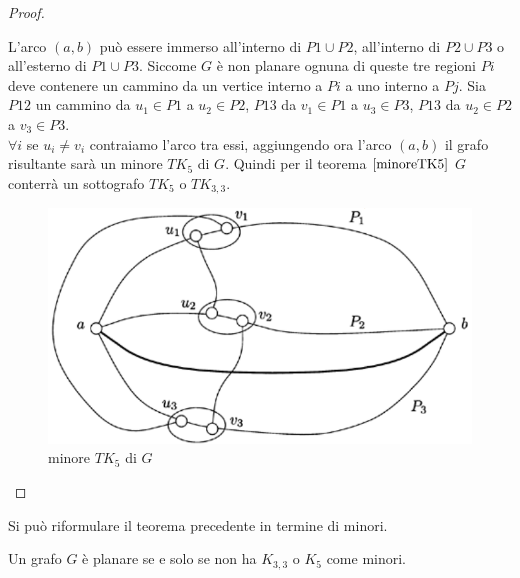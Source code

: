\begin{teorema}
\begin{proof}
\begin{enumerate}
            L'arco \((a,b)\) può essere immerso all'interno di \(P1 \cup P2\), all'interno di \(P2 \cup P3\) o all'esterno di \(P1 \cup P3\). Siccome \(G\) è non planare ognuna di queste tre regioni \(Pi\) deve contenere un cammino da un vertice interno a \(Pi\) a uno interno a \(Pj\). Sia \(P12\) un cammino da \(u_1 \in P1\) a \(u_2 \in P2\), \(P13\) da \(v_1 \in P1\) a \(u_3 \in P3\), \(P13\) da \(u_2 \in P2\) a \(v_3 \in P3\).\\
            \(\forall i\) se \(u_i \neq v_i\) contraiamo l'arco tra essi, aggiungendo ora l'arco \((a,b)\) il grafo risultante sarà un minore \(TK_5\) di \(G\). Quindi per il teorema \(\ref{minoreTK5}\) \(G\) conterrà un sottografo \(TK_5\) o \(TK_{3,3}\).
            \begin{figure}[H]
                \centering
                \includegraphics[scale=0.6]{img/minoreTK5.PNG}
                \caption{minore \(TK_5\) di \(G\)}
            \end{figure}
        \end{enumerate}
    \end{proof}
\end{teorema}
\noindent Si può riformulare il teorema precedente in termine di minori.
\begin{teorema}
    Un grafo \(G\) è planare se e solo se non ha \(K_{3,3}\) o \(K_5\) come minori.
\end{teorema}


